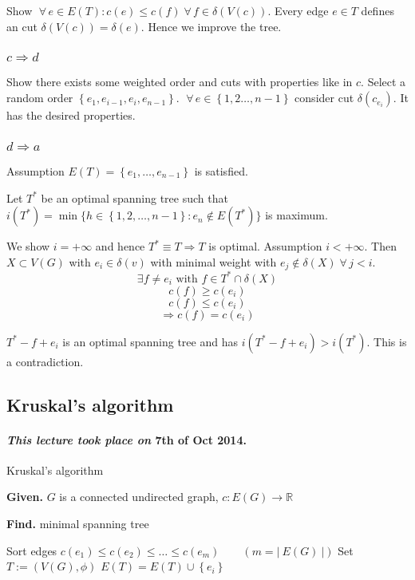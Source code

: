 \documentclass{article}
\newcommand{\card}[1]{\left|\:\!#1\:\!\right|}
\newcommand{\set}[1]{\left\{#1\right\}}
\newcommand{\given}[1]{\textbf{Given.} #1\par}
\newcommand{\find}[1]{\textbf{Find.} #1\par}
\newcommand{\dateref}[1]{\paragraph{\textit{This lecture took place on} #1.}}
\newcommand{\fall}{\;\forall\,}
\begin{document}
Show $\fall e \in E(T): c(e) \leq c(f) \fall f \in \delta(V(c))$. Every edge $e \in T$ defines an cut $\delta(V(c)) = \delta(e)$. Hence we improve the tree.

\subsubsection{$c \Rightarrow d$}
%
Show there exists some weighted order and cuts with properties like in $c$. Select a random order $\set{e_1, e_{i-1}, e_i, e_{n-1}}$. $\fall e \in \set{1, 2 \ldots, n-1}$ consider cut $\delta(c_{e_i})$. It has the desired properties.

\subsubsection{$d \Rightarrow a$}
%
Assumption $E(T) = \set{e_1, \ldots, e_{n-1}}$ is satisfied.

Let $T^*$ be an optimal spanning tree such that $i(T^*) = \min\{h \in \set{1, 2, \ldots, n-1}: e_n \notin E(T^*)\}$ is maximum.

We show $i = +\infty$ and hence $T^* \equiv T \Rightarrow T$ is optimal.
Assumption $i < +\infty$. Then $X \subset V(G)$ with $e_i \in \delta(v)$ with minimal weight with $e_j \notin \delta(X) \fall j < i$.
\[
  \exists f \neq e_i \text{ with } f \in T^* \cap \delta(X)
\] \[
  c(f) \geq c(e_i)
\] \[
  c(f) \leq c(e_i)
\] \[
  \Rightarrow c(f) = c(e_i)
\]

$T^* - f + e_i$ is an optimal spanning tree and has $i(T^* - f + e_i) > i(T^*)$. This is a contradiction.

\subsection{Kruskal's algorithm}
%
\dateref{7th of Oct 2014}

\begin{algorithm}
  \caption{Kruskal's algorithm}
  \label{kruskals-algo}
  \given{$G$ is a connected undirected graph, $c: E(G) \rightarrow \mathbb{R}$}
  \find{minimal spanning tree}
\begin{algorithmic}[1]
  \State Sort edges $c(e_1) \leq c(e_2) \leq \ldots \leq c(e_m) \qquad (m = \card{E(G)})$
  \State Set $T := (V(G), \phi)$
    \If{$T \cup \set{e_i}$ is cycle-free}
      \State $E(T) = E(T) \cup \set{e_i}$
    \EndIf
  \EndFor
\end{algorithmic}
\end{algorithm}
\end{document}

